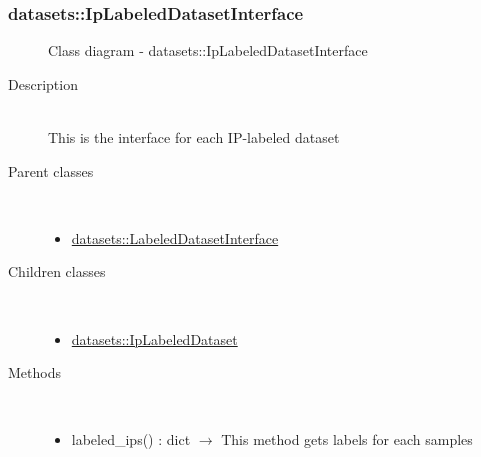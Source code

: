 \subsubsection[IpLabeledDatasetInterface]{datasets::IpLabeledDatasetInterface}
\begin{figure}[h]
\centering
{}
\caption{Class diagram - datasets::IpLabeledDatasetInterface}
\end{figure}\begin{description}
\item[Description] \hfill \\
 This is the interface for each IP-labeled dataset
\item[Parent classes] \hfill \\
 \vspace{-1cm}
\begin{itemize}
\item \hyperlink{datasets::LabeledDatasetInterface}{datasets::LabeledDatasetInterface}
\end{itemize}

\item[Children classes] \hfill \\
 \vspace{-1cm}
\begin{itemize}
\item \hyperlink{datasets::IpLabeledDataset}{datasets::IpLabeledDataset}
\end{itemize}

\item[Methods] \hfill \\
 \vspace{-1cm}
\begin{itemize}
\item labeled\_ips() : dict $\rightarrow$ This method gets labels for each samples
\end{itemize}

\end{description}
\hypertarget{datasets::UnlabeledDataset}{}
